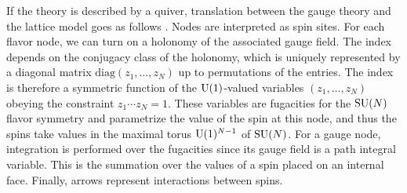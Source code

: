 If the theory is described by a quiver, translation between the gauge
theory and the lattice model goes as follows \cite{Yamazaki:2012cp,Yamazaki:2013nra}.
Nodes are interpreted as spin sites. For each flavor node, we can
turn on a holonomy of the associated gauge field. The index depends
on the conjugacy class of the holonomy, which is uniquely represented
by a diagonal matrix $\mathrm{diag}(z_{1},\ldots,z_{N})$ up to permutations
of the entries. The index is therefore a symmetric function of the
$\mathrm{U}(1)$-valued variables $(z_{1},\ldots,z_{N})$ obeying the constraint
$z_{1}\cdots z_{N}=1$. These variables are fugacities for the $\mathrm{SU}(N)$
flavor symmetry and parametrize the value of the spin at this node,
and thus the spins take values in the maximal torus $\mathrm{U}(1)^{N-1}$
of $\mathrm{SU}(N)$. For a gauge node, integration is performed over the fugacities
since its gauge field is a path integral variable. This is the summation
over the values of a spin placed on an internal face. Finally, arrows
represent interactions between spins.


